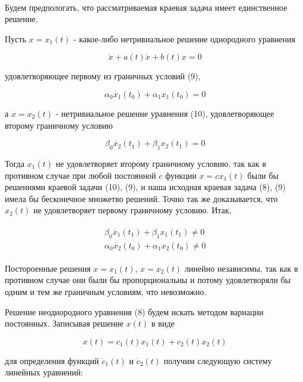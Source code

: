 \documentclass{article}
\theoremstyle{plain} \newtheorem*{theorem*}{Теорема}
\theoremstyle{plain} \newtheorem{theorem}{Теорема}[section]
\theoremstyle{defintition} \newtheorem*{corollary*}{Следствие}
\theoremstyle{remark} \newtheorem*{example*}{Пример}
\theoremstyle{remark} \newtheorem*{remark*}{Замечание}
\begin{document}
\mbox{} \\

Будем предпологать, что рассматриваемая краевая задача
имеет единственное решение.

Пусть $x = x_1(t)$ - какое-либо нетривиальное решение
однородного уравнения

\begin{equation}
    \ddot{x} + a(t) \dot{x} + b(t)x = 0
\end{equation}

удовлетворяющее первому из граничных условий (9),

\begin{equation*}
    \alpha_0 \dot{x_1}(t_0) + \alpha_1 x_1(t_0) = 0
\end{equation*}

а $x = x_2(t)$ - нетривиальное решение уравнения (10),
удовлетворяющее второму граничному условию

\begin{equation*}
    \beta_0 \dot{x_2}(t_1) + \beta_1 x_2(t_1) = 0
\end{equation*}

Тогда $x_1(t)$ не удовлетворяет второму граничному условию,
так как в противном случае при любой постоянной $c$
функции $x = c x_1(t)$ были бы решениями краевой задачи (10),
(9), и наша исходная краевая задача (8), (9) имела бы
бесконечное множетво решений. Точно так же доказывается, что
$x_2(t)$ не удовлетворяет первому граничному условию. Итак,

\begin{gather}
    \begin{split}
    \beta_0 \dot{x_1}(t_1) + \beta_1 x_1(t_1) \ne 0 \\
    \alpha_0 \dot{x_2}(t_0) + \alpha_1 x_2(t_0) \ne 0
    \end{split}
\end{gather}

Постороенные решения $x = x_1(t)$, $x = x_2(t)$ линейно
независимы, так как в противном случае они были бы
пропорциональны и потому удовлетворяли бы одним и тем же
граничным условиям, что невозможно.

Решение неоднородного уравнения (8) будем искать
методом вариации постоянных. Записывая решение $x(t)$
в виде

\begin{equation}
    x(t) = c_1(t) x_1(t) + c_2(t) x_2(t)
\end{equation}

для определения функций $\dot{c}_1(t)$ и $\dot{c}_2(t)$
получим следующую систему линейных уравнений:
\end{document}
